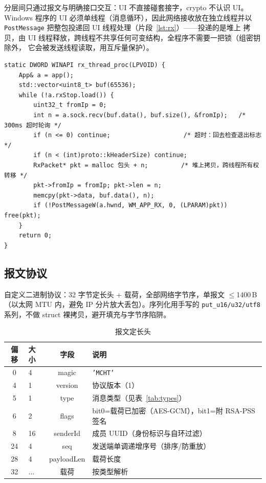 \documentclass[11pt,a4paper,fontset=fandol]{ctexart}
\begin{document}
\noindent 分层间只通过报文与明确接口交互：UI 不直接碰套接字，crypto 不认识 UI。
Windows 程序的 UI 必须单线程（消息循环），因此网络接收放在独立线程并以
\texttt{PostMessage} 把整包投递回 UI 线程处理（片段~\ref{lst:rx}）——投递的是堆上
拷贝，由 UI 线程释放，跨线程不共享任何可变结构，全程序不需要一把锁（组密钥除外，
它会被发送线程读取，用互斥量保护）。

\begin{lstlisting}[caption={net/rx\_thread.cpp：接收线程把整包投递给 UI 线程},label={lst:rx}]
static DWORD WINAPI rx_thread_proc(LPVOID) {
    App& a = app();
    std::vector<uint8_t> buf(65536);
    while (!a.rxStop.load()) {
        uint32_t fromIp = 0;
        int n = a.sock.recv(buf.data(), buf.size(), &fromIp);   /* 300ms 超时轮询 */
        if (n <= 0) continue;                    /* 超时：回去检查退出标志 */
        if (n < (int)proto::kHeaderSize) continue;
        RxPacket* pkt = malloc 包头 + n;         /* 堆上拷贝，跨线程所有权转移 */
        pkt->fromIp = fromIp; pkt->len = n;
        memcpy(pkt->data, buf.data(), n);
        if (!PostMessageW(a.hwnd, WM_APP_RX, 0, (LPARAM)pkt)) free(pkt);
    }
    return 0;
}
\end{lstlisting}

\subsection{报文协议}

自定义二进制协议：32 字节定长头 + 载荷，全部网络字节序，单报文 $\le$1400\,B
（以太网 MTU 内，避免 IP 分片放大丢包）。序列化用手写的
\texttt{put\_u16/u32/utf8} 系列，不做 struct 裸拷贝，避开填充与字节序陷阱。

\begin{table}[H]
\centering\small
\begin{tabularx}{0.95\textwidth}{clcl}
\toprule
偏移 & 大小 & 字段 & 说明 \\
\midrule
0 & 4 & magic & \texttt{'MCHT'} \\
4 & 1 & version & 协议版本（1） \\
5 & 1 & type & 消息类型（见表~\ref{tab:types}） \\
6 & 2 & flags & bit0=载荷已加密（AES-GCM），bit1=附 RSA-PSS 签名 \\
8 & 16 & senderId & 成员 UUID（身份标识与自环过滤） \\
24 & 4 & seq & 发送端单调递增序号（排序/防重放） \\
28 & 4 & payloadLen & 载荷长度 \\
32 & $\dots$ & 载荷 & 按类型解析 \\
\bottomrule
\end{tabularx}
\caption{报文定长头}
\label{tab:hdr}
\end{table}
\end{document}
